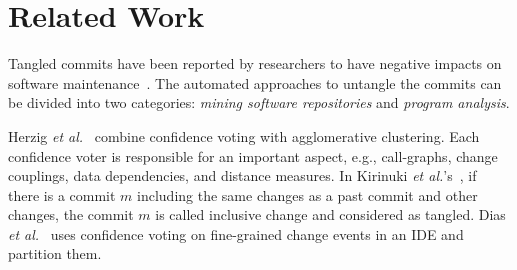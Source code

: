 \section{Related Work}
\label{related:sec}

Tangled commits have been reported by researchers to have negative impacts on software maintenance~\cite{tao-fse12,kim-emse16,kim-msr13,hill-tse12,nguyen-issre13,flexeme-fse20,smartcommit-fse21}.
The automated approaches to untangle the commits can be divided
into two categories: {\em mining software repositories} and {\em
  program analysis}.

 Herzig {\em et
  al.}~\cite{kim-msr13,kim-emse16} combine confidence voting with
agglomerative clustering.
Each confidence voter is responsible for an important aspect, e.g.,
call-graphs, change couplings, data dependencies, and distance
measures. In Kirinuki {\em et al.}'s~\cite{higo-apsec16, higo-icpc14},
if there is a commit $m$ including the same changes as a past commit
and other changes, the commit $m$ is called inclusive change and
considered as tangled. Dias {\em et al.}~\cite{dias-saner15} uses
confidence voting on fine-grained change events in an IDE and
partition them.
%


